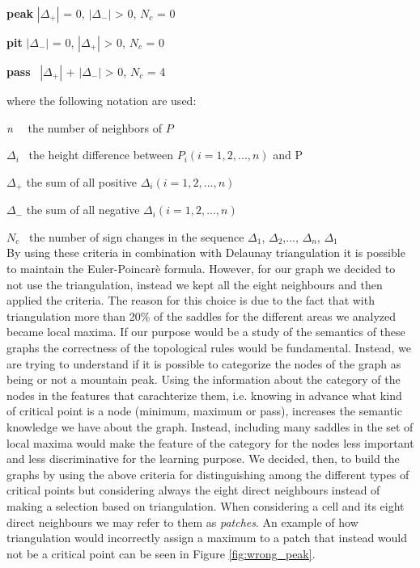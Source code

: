 \textbf{peak} \quad \(|\Delta_+|\) = 0, \quad \(|\Delta_-|\) > 0, \quad \(N_c\) = 0

\textbf{pit} \qquad \(|\Delta_-|\) = 0, \quad \(|\Delta_+|\) > 0, \quad \(N_c\) = 0

\textbf{pass} \ \quad \(|\Delta_+|\) + \(|\Delta_-|\) > 0, \quad \qquad \(N_c\) = 4

where the following notation are used:

\textit{n} \ \ \quad the number of neighbors of \(P\)

\(\Delta_i\) \ \quad the height difference between \(P_i(i=1,2,...,n)\) and P

\(\Delta_+\) \quad the sum of all positive \(\Delta_i(i=1,2,...,n)\)

\(\Delta_-\) \quad the sum of all negative \(\Delta_i(i=1,2,...,n)\)

\(N_c\) \quad \ the number of sign changes in the sequence \(\Delta_1\), \(\Delta_2\),..., \(\Delta_n\), \(\Delta_1\)
\\
By using these criteria in combination with Delaunay triangulation it is possible to maintain the Euler-Poincarè formula. However, for our graph we decided to not use the triangulation, instead we kept all the eight neighbours and then applied the criteria. The reason for this choice is due to the fact that with triangulation more than 20\% of the saddles for the different areas we analyzed became local maxima. If our purpose would be a study of the semantics of these graphs the correctness of the topological rules would be fundamental. Instead, we are trying to understand if it is possible to categorize the nodes of the graph as being or not a mountain peak. Using the information about the category of the nodes in the features that carachterize them, i.e. knowing in advance what kind of critical point is a node (minimum, maximum or pass), increases the semantic knowledge we have about the graph. Instead, including many saddles in the set of local maxima would make the feature of the category for the nodes less important and less discriminative for the learning purpose. We decided, then, to build the graphs by using the above criteria for distinguishing among the different types of critical points but considering always the eight direct neighbours instead of making a selection based on triangulation. When considering a cell and its eight direct neighbours we may refer to them as \textit{patches}. An example of how triangulation would incorrectly assign a maximum to a patch that instead would not be a critical point can be seen in Figure \ref{fig:wrong_peak}. 

